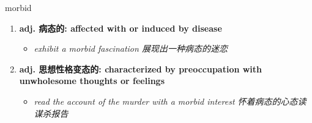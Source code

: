 
\begin{frame}
{\huge morbid}
\begin{center}
\begin{enumerate}\Large
  \item \textbf{adj. 病态的: affected with or induced by disease}
  \begin{itemize}
    \item \em{\Large{exhibit a morbid fascination 展现出一种病态的迷恋}}
  \end{itemize}
  \item \textbf{adj. 思想性格变态的: characterized by preoccupation with unwholesome thoughts or feelings}
  \begin{itemize}
    \item \em{\Large{read the account of the murder with a morbid interest 怀着病态的心态读谋杀报告}}
  \end{itemize}
\end{enumerate}
\end{center}
\end{frame}
